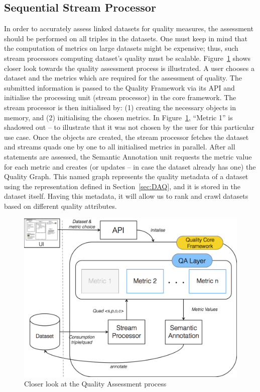 
\subsection{Sequential Stream Processor}
\label{sec:StreamProcessor} 
In order to accurately assess linked datasets for quality measures, the assessment should be performed on all triples in the datasets.
One must keep in mind that the computation of metrics on large datasets might be expensive; thus, such stream processors computing dataset's quality must be scalable.
Figure~\ref{fig:closerLook} shows closer look towards the quality assessment process is illustrated.
A user chooses a dataset and the metrics which are required for the assessment of quality.
The submitted information is passed to the Quality Framework via its API and initialise the processing unit (stream processor) in the core framework.
The stream processor is then initialised by: (1) creating the necessary objects in memory, and (2) initialising the chosen metrics. 
In Figure~\ref{fig:closerLook}, ``Metric 1'' is shadowed out – to illustrate that it was not chosen by the user for this particular use case.
Once the objects are created, the stream processor fetches the dataset and streams quads one by one to all initialised metrics in parallel.
After all statements are assessed, the Semantic Annotation unit requests the metric value for each metric and creates (or updates – in case the dataset already has one) the Quality Graph.
This named graph represents the quality metadata of a dataset using the representation defined in Section~\ref{sec:DAQ}, and it is stored in the dataset itself.
Having this metadata, it will allow us to rank and crawl datasets based on different quality attributes.

\begin{figure}[tbph]
\center
\includegraphics[scale=0.3]{images/closerLook.pdf} 
\caption{Closer look at the Quality Assessment process} 
\label{fig:closerLook}
\end{figure}

